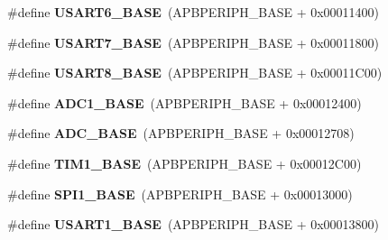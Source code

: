 \begin{DoxyCompactItemize}
\item 
\mbox{\label{group___peripheral__memory__map_gade4d3907fd0387ee832f426f52d568bb}} 
\#define {\bfseries U\+S\+A\+R\+T6\+\_\+\+B\+A\+SE}~(A\+P\+B\+P\+E\+R\+I\+P\+H\+\_\+\+B\+A\+SE + 0x00011400)
\item 
\mbox{\label{group___peripheral__memory__map_gac13dda65640b4f3a36d72b036367c66e}} 
\#define {\bfseries U\+S\+A\+R\+T7\+\_\+\+B\+A\+SE}~(A\+P\+B\+P\+E\+R\+I\+P\+H\+\_\+\+B\+A\+SE + 0x00011800)
\item 
\mbox{\label{group___peripheral__memory__map_ga2babded304d71c7be3e3bb4d2c0295bb}} 
\#define {\bfseries U\+S\+A\+R\+T8\+\_\+\+B\+A\+SE}~(A\+P\+B\+P\+E\+R\+I\+P\+H\+\_\+\+B\+A\+SE + 0x00011\+C00)
\item 
\mbox{\label{group___peripheral__memory__map_ga695c9a2f892363a1c942405c8d351b91}} 
\#define {\bfseries A\+D\+C1\+\_\+\+B\+A\+SE}~(A\+P\+B\+P\+E\+R\+I\+P\+H\+\_\+\+B\+A\+SE + 0x00012400)
\item 
\mbox{\label{group___peripheral__memory__map_gad06cb9e5985bd216a376f26f22303cd6}} 
\#define {\bfseries A\+D\+C\+\_\+\+B\+A\+SE}~(A\+P\+B\+P\+E\+R\+I\+P\+H\+\_\+\+B\+A\+SE + 0x00012708)
\item 
\mbox{\label{group___peripheral__memory__map_gaf8aa324ca5011b8173ab16585ed7324a}} 
\#define {\bfseries T\+I\+M1\+\_\+\+B\+A\+SE}~(A\+P\+B\+P\+E\+R\+I\+P\+H\+\_\+\+B\+A\+SE + 0x00012\+C00)
\item 
\mbox{\label{group___peripheral__memory__map_ga50cd8b47929f18b05efbd0f41253bf8d}} 
\#define {\bfseries S\+P\+I1\+\_\+\+B\+A\+SE}~(A\+P\+B\+P\+E\+R\+I\+P\+H\+\_\+\+B\+A\+SE + 0x00013000)
\item 
\mbox{\label{group___peripheral__memory__map_ga86162ab3f740db9026c1320d46938b4d}} 
\#define {\bfseries U\+S\+A\+R\+T1\+\_\+\+B\+A\+SE}~(A\+P\+B\+P\+E\+R\+I\+P\+H\+\_\+\+B\+A\+SE + 0x00013800)
\item 
\mbox{\label{group___peripheral__memory__map_ga7ab42ce1846930569d742d339b554078}} 

\end{DoxyCompactItemize}
